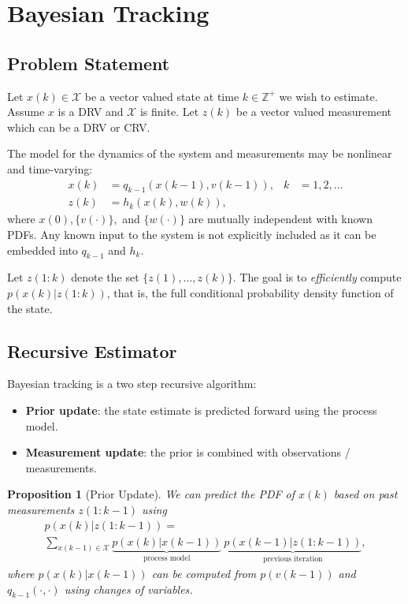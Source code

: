 \documentclass[]{hsrzf}
\theoremstyle{plain}
\newtheorem{prop}{Proposition}[section]
\theoremstyle{definition}
\theoremstyle{remark}
\begin{document}
\section{Bayesian Tracking} \label{sec:bayesian-tracking}

\subsection{Problem Statement}

Let $x(k) \in \mathcal{X}$ be a vector valued state at time $k \in
\mathbb{Z}^+$ we wish to estimate. Assume $x$ is a DRV and $\mathcal{X}$ is
finite. Let $z(k)$ be a vector valued measurement which can be a DRV or CRV.

The model for the dynamics of the system and measurements may be nonlinear and
time-varying:
\begin{align*}
  x(k) &= q_{k-1}(x(k-1), v(k-1)), & k&=1,2,\ldots \\
  z(k) &= h_k(x(k), w(k)),
\end{align*}
where $x(0), \{v(\cdot)\},$ and $\{w(\cdot)\}$ are mutually independent with
known PDFs. Any known input to the system is not explicitly included as it can
be embedded into $q_{k-1}$ and $h_k$.

Let $z(1:k)$ denote the set $\{z(1), \ldots, z(k)\}$. The goal is to
\emph{efficiently} compute $p(x(k) | z(1:k))$, that is, the full conditional
probability density function of the state.

\subsection{Recursive Estimator}
\label{sec:bayesian-tracking:recursive-estimator}

\ifexamprint\else
Bayesian tracking is a two step recursive algorithm:
\begin{itemize}
  \item \textbf{Prior update}: the state estimate is predicted forward using
    the process model.
  \item \textbf{Measurement update}: the prior is combined with observations /
    measurements.
\end{itemize}
\fi

\begin{prop}[Prior Update]
  We can predict the PDF of $x(k)$ based on past measurements $z(1:k-1)$ using
  \begin{gather*}
    p(x(k)|z(1:k-1)) = \\
      \sum_{x(k-1) \in \mathcal{X}}
      \underbrace{p(x(k) | x(k-1))}_{\text{process model}} ~
      \underbrace{p(x(k-1) | z(1:k-1))}_{\text{previous iteration}},
  \end{gather*}
  where $p(x(k) | x(k-1))$ can be computed from $p(v(k-1))$ and
  $q_{k-1}(\cdot, \cdot)$ using changes of variables.
\end{prop}
\end{document}
